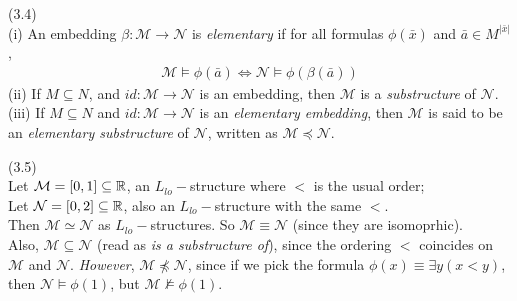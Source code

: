 \documentclass[a4paper]{article}
\begin{document}
\begin{defi} (3.4)\\
    (i) An embedding $\beta: \mathcal{M} \to \mathcal{N}$ is \emph{elementary} if for all formulas $\phi(\bar{x})$ and $\bar{a} \in M^{|\bar{x}|}$,
    \begin{equation*}
        \begin{aligned}
            \mathcal{M} \vDash \phi(\bar{a}) \iff \mathcal{N} \vDash \phi(\beta(\bar{a}))
        \end{aligned}
    \end{equation*}
    (ii) If $M \subseteq N$, and $id:\mathcal{M} \to \mathcal{N}$ is an embedding, then $\mathcal{M}$ is a \emph{substructure} of $\mathcal{N}$.\\
    (iii) If $M \subseteq N$ and $id:\mathcal{M} \to \mathcal{N}$ is an \emph{elementary embedding}, then $\mathcal{M}$ is said to be an \emph{elementary substructure} of $\mathcal{N}$, written as $\mathcal{M} \preccurlyeq \mathcal{N}$.
\end{defi}

\begin{eg} (3.5)\\
    Let $\mathcal{M} = [0,1] \subseteq \mathbb{R}$, an $L_{lo}-$structure where $<$ is the usual order;\\
    Let $\mathcal{N} = [0,2] \subseteq \mathbb{R}$, also an $L_{lo}-$structure with the same $<$.\\
    Then $\mathcal{M} \simeq \mathcal{N}$ as $L_{lo}-$structures. So $\mathcal{M} \equiv \mathcal{N}$ (since they are isomoprhic).\\
    Also, $\mathcal{M} \subseteq \mathcal{N}$ (read as \emph{is a substructure of}), since the ordering $<$ coincides on $\mathcal{M}$ and $\mathcal{N}$. \emph{However}, $\mathcal{M} \not\preccurlyeq \mathcal{N}$, since if we pick the formula $\phi(x) \equiv \exists y (x<y)$, then $\mathcal{N} \vDash \phi(1)$, but $\mathcal{M} \not\vDash \phi(1)$.
\end{eg}
\end{document}
